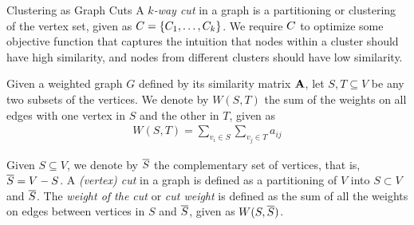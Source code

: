 \begin{frame}{Clustering as Graph Cuts}
A {\em $k$-way cut} in a graph is a partitioning or clustering of
the vertex set, given as ${\relax C} = \{C_1, \ldots, C_k\}$.
We require ${\relax C}$ to optimize
some objective function that captures the intuition that nodes
within a cluster should have high similarity, and nodes from
different clusters should have low similarity.

\medskip
Given a weighted graph $G$ def\/{i}ned by its similarity matrix $\mathbf{A}$,
let $S, T \subseteq V$ be any two
subsets of the vertices. We denote by $W(S,T)$ the sum of the
weights on all edges with one vertex in $S$ and the other in $T$,
given as
\begin{align*}
    W(S, T) = \sum_{v_i \in S} \sum_{v_{j} \in T} a_{ij}
\end{align*}

\medskip
Given $S \subseteq V$, we denote by $\overline{S}$ the complementary set
of vertices, that is, $\overline{S} = V - S$. A {\em (vertex) cut} in a
graph is def\/{i}ned as a partitioning of $V$ into $S \subset V$ and
$\overline{S}$. The {\em weight of the cut} or {\em cut weight} is
def\/{i}ned as the sum of all the weights on
edges between vertices in $S$
and $\overline{S}$, given as $W(S, \overline{S})$.
\end{frame}


